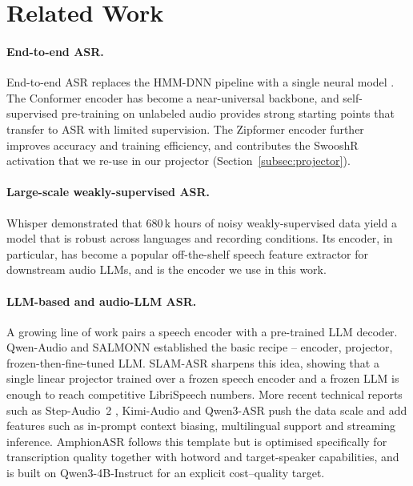 \section{Related Work}
\label{sec:related}

\paragraph{End-to-end ASR.}
End-to-end ASR replaces the HMM-DNN pipeline with a single neural model
\cite{graves2006ctc, graves2012rnnt, chan2016las}. The Conformer
encoder \cite{gulati2020conformer} has become a near-universal
backbone, and self-supervised pre-training on unlabeled audio
\cite{baevski2020wav2vec2, hsu2021hubert} provides strong starting
points that transfer to ASR with limited supervision. The Zipformer
encoder \cite{yao2024zipformer} further improves accuracy and
training efficiency, and contributes the SwooshR activation that we
re-use in our projector (Section~\ref{subsec:projector}).

\paragraph{Large-scale weakly-supervised ASR.}
Whisper \cite{radford2023whisper} demonstrated that 680\,k hours of
noisy weakly-supervised data yield a model that is robust across
languages and recording conditions. Its encoder, in particular, has
become a popular off-the-shelf speech feature extractor for downstream
audio LLMs, and is the encoder we use in this work.

\paragraph{LLM-based and audio-LLM ASR.}
A growing line of work pairs a speech encoder with a pre-trained LLM
decoder. Qwen-Audio \cite{chu2023qwenaudio} and
SALMONN \cite{tang2024salmonn} established the basic recipe --
encoder, projector, frozen-then-fine-tuned LLM. SLAM-ASR
\cite{ma2024slamasr} sharpens this idea, showing that a single linear
projector trained over a frozen speech encoder and a frozen LLM is
enough to reach competitive LibriSpeech numbers. More recent technical
reports such as Step-Audio~2 \cite{stepaudio22025},
Kimi-Audio \cite{kimiaudio2025} and Qwen3-ASR
\cite{qwen2025qwen3asr} push the data scale and add features such as
in-prompt context biasing, multilingual support and streaming
inference. AmphionASR follows this template but is optimised
specifically for transcription quality together with hotword and
target-speaker capabilities, and is built on Qwen3-4B-Instruct
\cite{qwen2025qwen3} for an explicit cost--quality target.

